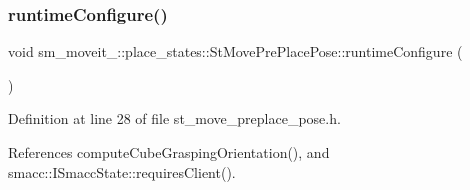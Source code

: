 \subsubsection{\texorpdfstring{runtime\+Configure()}{runtimeConfigure()}}
{\footnotesize\ttfamily void sm\+\_\+moveit\+\_\+::place\+\_\+states\+::\+St\+Move\+Pre\+Place\+Pose\+::runtime\+Configure (\begin{DoxyParamCaption}{ }\end{DoxyParamCaption})\hspace{0.3cm}{\ttfamily [inline]}}



Definition at line 28 of file st\+\_\+move\+\_\+preplace\+\_\+pose.\+h.



References compute\+Cube\+Grasping\+Orientation(), and smacc\+::\+I\+Smacc\+State\+::requires\+Client().


